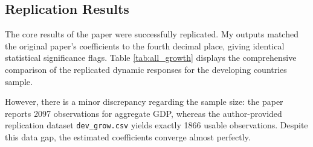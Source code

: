 \documentclass[11pt, a4paper]{article}
\begin{document}
\subsection{Replication Results}
The core results of the paper were successfully replicated. My outputs matched the original paper’s coefficients to the fourth decimal place, giving identical statistical significance flags. Table \ref{tab:all_growth} displays the comprehensive comparison of the replicated dynamic responses for the developing countries sample.

However, there is a minor discrepancy regarding the sample size: the paper reports 2097 observations for aggregate GDP, whereas the author-provided replication dataset \texttt{dev\_grow.csv} yields exactly 1866 usable observations. Despite this data gap, the estimated coefficients converge almost perfectly.
\end{document}
